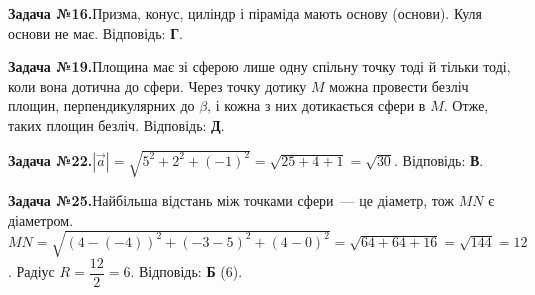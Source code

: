 \documentclass[12pt]{article}
\begin{document}
\par\vspace{0.3cm}\noindent\hypertarget{sol:16}{}
\begin{tcolorbox}[colback=titleBg!40, colframe=mainGreen!55, boxrule=0.4pt, arc=2pt, left=6pt, right=6pt, top=4pt, bottom=4pt, breakable]
\noindent\small\textbf{Задача №16.}\quad Призма, конус, циліндр і піраміда мають основу (основи). Куля основи не має. Відповідь: \textbf{Г}.
\par\vspace{0.1cm}\hfill\hyperlink{task:16}{}
\end{tcolorbox}
\par\vspace{0.3cm}\noindent\hypertarget{sol:19}{}
\begin{tcolorbox}[colback=titleBg!40, colframe=mainGreen!55, boxrule=0.4pt, arc=2pt, left=6pt, right=6pt, top=4pt, bottom=4pt, breakable]
\noindent\small\textbf{Задача №19.}\quad Площина має зі сферою лише одну спільну точку тоді й тільки тоді, коли вона дотична до сфери. Через точку дотику $M$ можна провести безліч площин, перпендикулярних до $\beta$, і кожна з них дотикається сфери в $M$. Отже, таких площин безліч. Відповідь: \textbf{Д}.
\par\vspace{0.1cm}\hfill\hyperlink{task:19}{}
\end{tcolorbox}
\par\vspace{0.3cm}\noindent\hypertarget{sol:22}{}
\begin{tcolorbox}[colback=titleBg!40, colframe=mainGreen!55, boxrule=0.4pt, arc=2pt, left=6pt, right=6pt, top=4pt, bottom=4pt, breakable]
\noindent\small\textbf{Задача №22.}\quad $|\vec{a}|=\sqrt{5^2+2^2+(-1)^2}=\sqrt{25+4+1}=\sqrt{30}$. Відповідь: \textbf{В}.
\par\vspace{0.1cm}\hfill\hyperlink{task:22}{}
\end{tcolorbox}
\par\vspace{0.3cm}\noindent\hypertarget{sol:25}{}
\begin{tcolorbox}[colback=titleBg!40, colframe=mainGreen!55, boxrule=0.4pt, arc=2pt, left=6pt, right=6pt, top=4pt, bottom=4pt, breakable]
\noindent\small\textbf{Задача №25.}\quad Найбільша відстань між точками сфери~--- це діаметр, тож $MN$ є діаметром. $MN=\sqrt{(4-(-4))^2+(-3-5)^2+(4-0)^2}=\sqrt{64+64+16}=\sqrt{144}=12$. Радіус $R=\dfrac{12}{2}=6$. Відповідь: \textbf{Б} ($6$).
\par\vspace{0.1cm}\hfill\hyperlink{task:25}{}
\end{tcolorbox}
\end{document}
